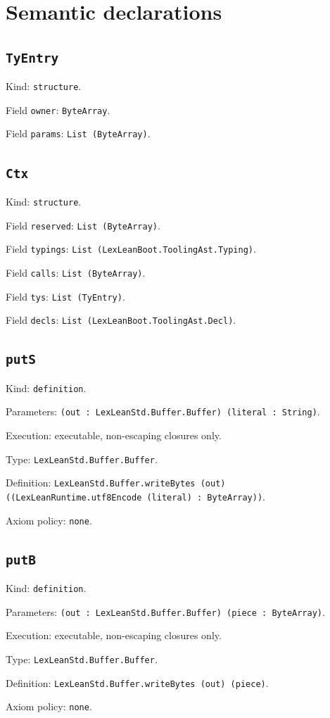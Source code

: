 \documentclass[11pt]{article}
\begin{document}
\section*{Semantic declarations}
\subsection*{\texttt{TyEntry}}
\noindent Kind: \texttt{structure}.\par
\noindent Field \texttt{owner}: \texttt{ByteArray}.\par
\noindent Field \texttt{params}: \texttt{List (ByteArray)}.\par
\subsection*{\texttt{Ctx}}
\noindent Kind: \texttt{structure}.\par
\noindent Field \texttt{reserved}: \texttt{List (ByteArray)}.\par
\noindent Field \texttt{typings}: \texttt{List (LexLeanBoot.ToolingAst.Typing)}.\par
\noindent Field \texttt{calls}: \texttt{List (ByteArray)}.\par
\noindent Field \texttt{tys}: \texttt{List (TyEntry)}.\par
\noindent Field \texttt{decls}: \texttt{List (LexLeanBoot.ToolingAst.Decl)}.\par
\subsection*{\texttt{putS}}
\noindent Kind: \texttt{definition}.\par
\noindent Parameters: \texttt{(out : LexLeanStd.Buffer.Buffer) (literal : String)}.\par
\noindent Execution: executable, non-escaping closures only.\par
\noindent Type: \texttt{LexLeanStd.Buffer.Buffer}.\par
\noindent Definition: \texttt{LexLeanStd.Buffer.writeBytes (out) ((LexLeanRuntime.utf8Encode (literal) : ByteArray))}.\par
\noindent Axiom policy: \texttt{none}.\par
\subsection*{\texttt{putB}}
\noindent Kind: \texttt{definition}.\par
\noindent Parameters: \texttt{(out : LexLeanStd.Buffer.Buffer) (piece : ByteArray)}.\par
\noindent Execution: executable, non-escaping closures only.\par
\noindent Type: \texttt{LexLeanStd.Buffer.Buffer}.\par
\noindent Definition: \texttt{LexLeanStd.Buffer.writeBytes (out) (piece)}.\par
\noindent Axiom policy: \texttt{none}.\par
\end{document}
